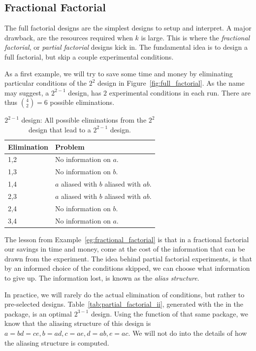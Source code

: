 \subsection{Fractional Factorial}
The full factorial designs are the simplest designs to setup and interpret. 
A major drawback, are the resources required when $k$ is large. 
This is where the \emph{fractional factorial}, or \emph{partial factorial} designs kick in.
The fundamental idea is to design a full factorial, but skip a couple experimental conditions. 


\begin{example}[From $2^2$ to $2^{(2-1)}$]
\label{eg:fractional_factorial}
As a first example, we will try to save some time and money by eliminating particular conditions of the $2^2$ design in Figure~\ref{fig:full_factorial}.
As the name may suggest, a $2^{2-1}$ design, has $2$ experimental conditions in each run. 
There are thus $\binom{4}{2}=6$ possible eliminations.
\begin{table}
\begin{tabular}{|p{2.5cm}|p{10cm}|}
\hline Elimination &  Problem \\ 
\hline
\hline 1,2 &  No information on $a$. \\ 
\hline 1,3 &  No information on $b$.\\ 
\hline 1,4 &  $a$ aliased with $b$ aliased with $ab$. \\ 
\hline 2,3 &  $a$ aliased with $b$ aliased with $ab$. \\ 
\hline 2,4 &  No information on $b$. \\ 
\hline 3,4 &  No information on $a$.\\ 
\hline 
\end{tabular} 
\label{tab:partial_factorial}
\caption{$2^{2-1}$ design: All possible eliminations from the $2^2$ design that lead to a $2^{2-1}$ design.}
\end{table}
\end{example}

The lesson from Example~\ref{eg:fractional_factorial} is that in a fractional factorial our savings in time and money, come at the cost of the information that can be drawn from the experiment.
The idea behind partial factorial experiments, is that by an informed choice of the conditions skipped, we can choose what information to give up. The information lost, is known as the \emph{alias structure}.

In practice, we will rarely do the actual elimination of conditions, but rather to pre-selected designs. 
Table~\ref{tab:partial_factorial_ii}, generated with the  in the  \R package, is an optimal $2^{3-1}$ design.
Using the  function of that same package, we know that the aliasing structure of this design is
$a=bd=ce, b=ad, c=ae, d=ab, e=ac$.
We will not do into the details of how the aliasing structure is computed. 

